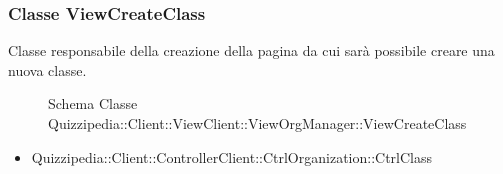 \subsubsection{Classe ViewCreateClass}
Classe responsabile della creazione della pagina da cui sarà possibile creare una nuova classe.
\begin{figure}[H]
\centering
\noindent{}
\caption[Schema Classe ViewCreateClass]{Schema Classe Quizzipedia::Client::ViewClient::ViewOrgManager::ViewCreateClass}
\end{figure}
\begin{itemize}
\item Quizzipedia::Client::ControllerClient::CtrlOrganization::CtrlClass
\end{itemize}
